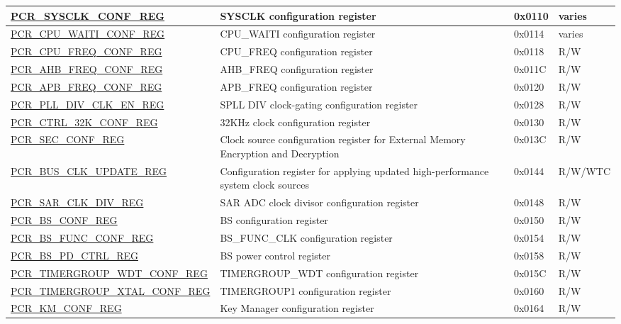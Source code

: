 \begin{longtable}{ | p{7cm} | p{6.2cm} | p{1.3cm} | p{1.5cm} | }
\hyperref[regdesc:PCRSYSCLKCONFREG]{PCR\_SYSCLK\_CONF\_REG} & SYSCLK configuration register & 0x0110 & varies \\ \hline
\hyperref[regdesc:PCRCPUWAITICONFREG]{PCR\_CPU\_WAITI\_CONF\_REG} & CPU\_WAITI configuration register & 0x0114 & varies \\ \hline
\hyperref[regdesc:PCRCPUFREQCONFREG]{PCR\_CPU\_FREQ\_CONF\_REG} & CPU\_FREQ configuration register & 0x0118 & R/W \\ \hline
\hyperref[regdesc:PCRAHBFREQCONFREG]{PCR\_AHB\_FREQ\_CONF\_REG} & AHB\_FREQ configuration register & 0x011C & R/W \\ \hline
\hyperref[regdesc:PCRAPBFREQCONFREG]{PCR\_APB\_FREQ\_CONF\_REG} & APB\_FREQ configuration register & 0x0120 & R/W \\ \hline
\hyperref[regdesc:PCRPLLDIVCLKENREG]{PCR\_PLL\_DIV\_CLK\_EN\_REG} & SPLL DIV clock-gating configuration register & 0x0128 & R/W \\ \hline
\hyperref[regdesc:PCRCTRL32KCONFREG]{PCR\_CTRL\_32K\_CONF\_REG} & 32KHz clock configuration register & 0x0130 & R/W \\ \hline
\hyperref[regdesc:PCRSECCONFREG]{PCR\_SEC\_CONF\_REG} & Clock source configuration register for External Memory Encryption and Decryption & 0x013C & R/W \\ \hline
\hyperref[regdesc:PCRBUSCLKUPDATEREG]{PCR\_BUS\_CLK\_UPDATE\_REG} & Configuration register for applying updated high-performance system clock sources & 0x0144 & R/W/WTC \\ \hline
\hyperref[regdesc:PCRSARCLKDIVREG]{PCR\_SAR\_CLK\_DIV\_REG} & SAR ADC clock divisor configuration register & 0x0148 & R/W \\ \hline
\hyperref[regdesc:PCRBSCONFREG]{PCR\_BS\_CONF\_REG} & BS configuration register & 0x0150 & R/W \\ \hline
\hyperref[regdesc:PCRBSFUNCCONFREG]{PCR\_BS\_FUNC\_CONF\_REG} & BS\_FUNC\_CLK configuration register & 0x0154 & R/W \\ \hline
\hyperref[regdesc:PCRBSPDCTRLREG]{PCR\_BS\_PD\_CTRL\_REG} & BS power control register & 0x0158 & R/W \\ \hline
\hyperref[regdesc:PCRTIMERGROUPWDTCONFREG]{PCR\_TIMERGROUP\_WDT\_CONF\_REG} & TIMERGROUP\_WDT configuration register & 0x015C & R/W \\ \hline
\hyperref[regdesc:PCRTIMERGROUPXTALCONFREG]{PCR\_TIMERGROUP\_XTAL\_CONF\_REG} & TIMERGROUP1 configuration register & 0x0160 & R/W \\ \hline
\hyperref[regdesc:PCRKMCONFREG]{PCR\_KM\_CONF\_REG} & Key Manager configuration register & 0x0164 & R/W \\ \hline

\end{longtable}
